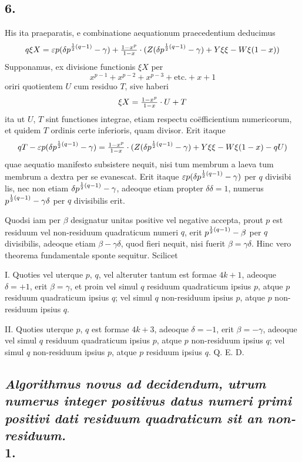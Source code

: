 \documentclass[twoside,12pt]{memoir}
\let\oldfrac\frac
\def\frac#1#2{\mathchoice{\tfrac{#1}{#2}}{\oldfrac{#1}{#2}}{\genfrac{}{}{}{2}{#1}{#2\mathstrut}}{\genfrac{}{}{}{3}{#1}{#2\mathstrut}}}
\begin{document}
\subsection*{6.}
 
His ita praeparatis, e combinatione aequationum praecedentium deducimus
\[q \xi {X}=\varepsilon p(\delta p^{\frac{1}{2}(q-1)}-\gamma)+\frac{1-x^{p}}{1-x} \cdot(Z(\delta p^{\frac{1}{2}(q-1)}-\gamma)+Y \xi \xi-W \xi(1-x))\]
Supponamus, ex divisione functionis \(\xi X\) per
\[x^{p-1}+x^{p-2}+x^{p-3}+\text{etc.}+x+1\]
oriri quotientem \(U\) cum residuo \(T\), sive haberi
\[\xi X=\frac{1-x^{p}}{1-x} \cdot U+T\]
ita ut \(U\), \(T\) sint functiones integrae, etiam respectu coëfficientium numericorum, et quidem \(T\) ordinis certe inferioris, quam divisor. Erit itaque
\[q T-\varepsilon p(\delta p^{\frac{1}{2}(q-1)}-\gamma)=\frac{1-x^{p}}{1-x} \cdot(Z(\delta p^{\frac{1}{2}(q-1)}-\gamma)+Y \xi \xi-W \xi(1-x)-q U)\]
quae aequatio manifesto subsistere nequit, nisi tum membrum a laeva tum membrum a dextra per se evanescat. Erit itaque \(\varepsilon p(\delta p^{\frac{1}{2}(q-1)}-\gamma)\) per \(q\) divisibi\pagebreak%
lis, nec non etiam \(\delta p^{\frac{1}{2}(q-1)}-\gamma\), adeoque etiam propter \(\delta \delta=1\), numerus \(p^{\frac{1}{2}(q-1)}-\gamma \delta\) per \(q\) divisibilis erit.

Quodsi iam per \(\beta\) designatur unitas positive vel negative accepta, prout \(p\) est residuum vel non-residuum quadraticum numeri \(q\), erit \(p^{\frac{1}{2}(q-1)}-\beta\) per \(q\) divisibilis, adeoque etiam \(\beta-\gamma \delta\), quod fieri nequit, nisi fuerit \(\beta=\gamma \delta\). Hinc vero theorema fundamentale sponte sequitur. Scilicet
 
I. Quoties vel uterque \(p\), \(q\), vel alteruter tantum est formae \(4 k+1\), adeoque \(\delta=+1\), erit \(\beta=\gamma\), et proin vel simul \(q\) residuum quadraticum ipsius \(p\), atque \(p\) residuum quadraticum ipsius \(q\); vel simul \(q\) non-residuum ipsius \(p\), atque \(p\) non-residuum ipsius \(q\).
 
II. Quoties uterque \(p\), \(q\) est formae \(4 k+3\), adeoque \(\delta=-1\), erit \(\beta=-\gamma\), adeoque vel simul \(q\) residuum quadraticum ipsius \(p\), atque \(p\) non-residuum ipsius \(q\); vel simul \(q\) non-residuum ipsius \(p\), atque \(p\) residuum ipsius \(q\). Q. E. D.

\subsection*{{\scriptsize \textit{Algorithmus novus ad decidendum, utrum numerus integer positivus datus numeri primi positivi dati residuum quadraticum sit an non-residuum.}}\\
1.}
 
\end{document}
